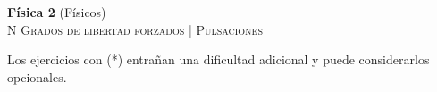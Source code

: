 \documentclass[11pt,spanish,a4paper]{article}
\begin{document}
\begin{center}
\textbf{Física 2} (Físicos) \hfill {}\\
	\textsc{\LARGE N Grados de libertad forzados | Pulsaciones}
\end{center}

Los ejercicios con (*) entrañan una dificultad adicional y puede considerarlos opcionales.


\begin{enumerate}



								



\end{enumerate}
\end{document}
